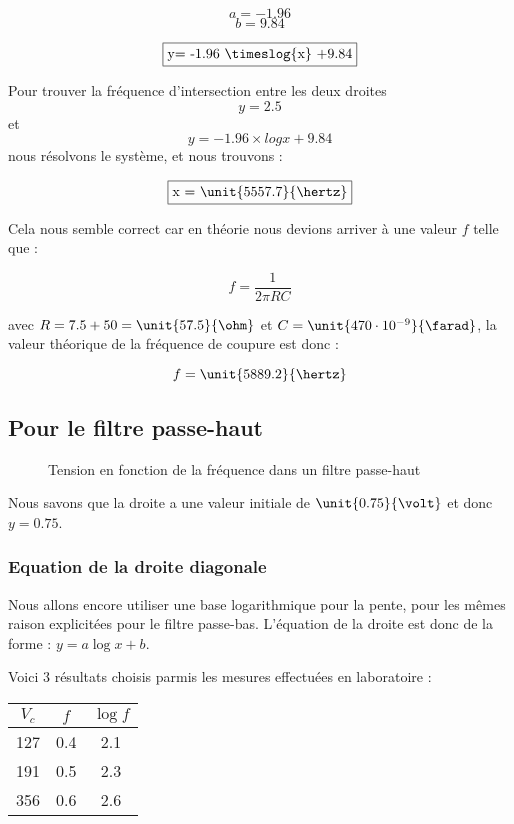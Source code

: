 $$a = -1.96$$
$$b= 9.84$$

$$\fbox{y= -1.96 \timeslog{x} +9.84}$$

Pour trouver la fréquence d'intersection entre les deux droites $$y=2.5$$ et $$y= -1.96 \times log{x} +9.84$$ nous résolvons le système, et nous trouvons : 

$$\fbox{x = \unit{5557.7}{\hertz}}$$ 

Cela nous semble correct car en théorie nous devions arriver à une valeur $f$ telle que : 

$$f=\frac{1}{2\pi RC}$$

avec $R= 7.5 + 50 = \unit{57.5}{\ohm}$ et $C= \unit{470 \cdot 10^{-9}}{\farad}$, la valeur théorique de la fréquence de coupure est donc :

$$f= \unit{5889.2}{\hertz}$$

\subsection{Pour le filtre passe-haut}

\begin{figure}[h]
		\centering
   
		\caption{\label{premierebissectrice}Tension en fonction de la fréquence dans un filtre passe-haut}
\end{figure}



Nous savons que la droite a une valeur initiale de $\unit{0.75}{\volt}$ et donc $y = 0.75$.

\subsubsection{Equation de la droite diagonale}

Nous allons encore utiliser une base logarithmique pour la pente, pour les mêmes raison explicitées pour le filtre passe-bas. 
L'équation de la droite est donc de la forme : $y=a\log{x}+b$.

Voici 3 résultats choisis parmis les mesures effectuées en laboratoire :

\begin{center}
	\begin{tabular}{|c|c|c|}
		\hline
		$V_c$ & $f$ & $\log{f}$ \\
		\hline
		127 & 0.4 & 2.1\\
		\hline
		191 & 0.5 & 2.3\\
		\hline
		356 & 0.6 & 2.6 \\
		\hline
	\end{tabular}
\end{center}


